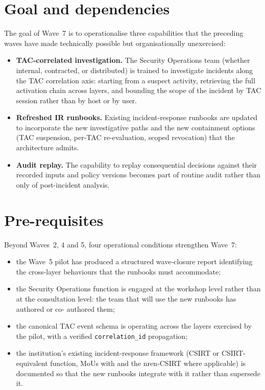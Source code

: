 \section{Goal and dependencies}
\label{sec:w7-goal}

The goal of Wave~7 is to operationalise three capabilities that
the preceding waves have made technically possible but
organisationally unexercised:

\begin{itemize}[leftmargin=1.5em,nosep]
  \item \textbf{TAC-correlated investigation.} The Security
    Operations team (whether internal, contracted, or
    distributed) is trained to investigate incidents along the
    TAC correlation axis: starting from a suspect activity,
    retrieving the full activation chain across layers, and
    bounding the scope of the incident by TAC session rather than
    by host or by user.
  \item \textbf{Refreshed IR runbooks.} Existing
    incident-response runbooks are updated to incorporate the
    new investigative paths and the new containment options
    (TAC suspension, per-TAC re-evaluation, scoped revocation)
    that the architecture admits.
  \item \textbf{Audit replay.} The capability to replay
    consequential decisions against their recorded inputs and
    policy versions becomes part of routine audit rather than
    only of post-incident analysis.
\end{itemize}

\section{Pre-requisites}
\label{sec:w7-prereq}

Beyond Waves~2, 4 and 5, four operational conditions strengthen
Wave~7:

\begin{itemize}[leftmargin=1.5em,nosep]
  \item the Wave~5 pilot has produced a structured wave-closure
    report identifying the cross-layer behaviours that the
    runbooks must accommodate;
  \item the Security Operations function is engaged at the
    workshop level rather than at the consultation level: the
    team that will use the new runbooks has authored or co-
    authored them;
  \item the canonical TAC event schema is operating across the
    layers exercised by the pilot, with a verified
    \texttt{correlation\_id} propagation;
  \item the institution's existing incident-response framework
    (CSIRT or CSIRT-equivalent function, MoUs with
     and the \gls{nren}-CSIRT where applicable)
    is documented
    so that the new runbooks integrate with it rather than
    supersede it.
\end{itemize}

